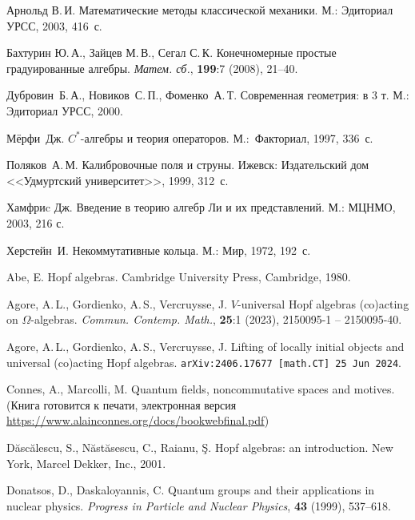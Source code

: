 \documentclass[12pt, reqno, a4paper, oneside, notitlepage]{amsart}
\theoremstyle{mytheoremstyle}
\theoremstyle{myremarkstyle}
\numberwithin{equation}{section}
\begin{document}
\newpage
\begin{thebibliography}{99}
	
\normalsize


 Арнольд В.\,И. Математические методы классической механики. М.: Эдиториал УРСС, 2003, 416~с.

 Бахтурин Ю.\,А., Зайцев М.\,В., Сегал С.\,К.
Конечномерные простые градуированные алгебры. \textit{Матем. сб.}, \textbf{199}:7 (2008), 21--40.


Дубровин~Б.\,А., Новиков~С.\,П., Фоменко~А.\,Т. Современная геометрия: в 3 т.
М.: Эдиториал УРСС, 2000.


 Мёрфи~Дж. $C^*$-алгебры и теория операторов. М.:~Факториал, 1997, 336~с.


 Поляков~А.\,М. Калибровочные поля и струны. Ижевск: Издательский дом <<Удмуртский университет>>, 1999, 312~с.


  Хамфриc Дж. Введение в теорию алгебр Ли и их представлений. М.: МЦНМО, 2003, 216 с. 

 Херстейн~И. Некоммутативные кольца.
М.: Мир, 1972, 192~с.

 Abe, E. Hopf algebras. Cambridge University Press, Cambridge, 1980.

Agore, A.\,L., Gordienko, A.\,S., Vercruysse, J.
$V$-universal Hopf algebras (co)acting on $\Omega$-algebras. \textit{Commun. Contemp. Math.},
\textbf{25}:1 (2023), 2150095-1 -- 2150095-40. 

Agore, A.\,L., Gordienko, A.\,S., Vercruysse, J.
Lifting of locally initial objects and universal (co)acting Hopf algebras.
\texttt{arXiv:2406.17677 [math.CT] 25 Jun 2024}.


 Connes, A., Marcolli, M. Quantum fields, noncommutative spaces and motives. (Книга готовится к печати, электронная версия \url{https://www.alainconnes.org/docs/bookwebfinal.pdf})


 D\u asc\u alescu, S., N\u ast\u asescu, C., Raianu, \c S.
Hopf algebras: an introduction. New York, Marcel Dekker, Inc., 2001.


 Donatsos, D., Daskaloyannis, C. Quantum groups and their applications in nuclear physics. \textit{Progress in Particle and Nuclear Physics},  \textbf{43} (1999), 537--618.



\end{thebibliography}
\end{document}
